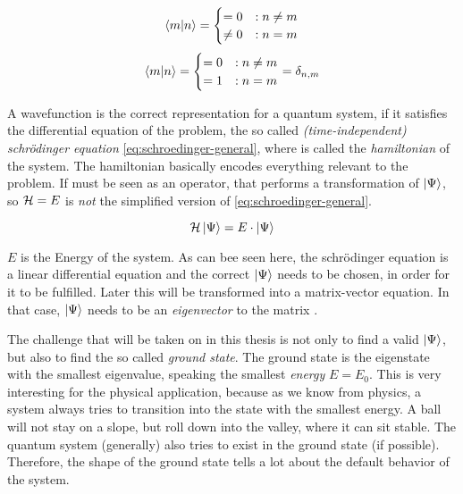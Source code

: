 \begin{equation}
    \label{eq:base-orthagonal}
    \bra{m}\ket{n} = \begin{cases}
         = 0 &: n\neq m\\
         \neq 0 &: n = m
    \end{cases}
\end{equation}
\begin{equation}
    \label{eq:base-orthonormal}
    \bra{m}\ket{n} = \begin{cases}
         = 0 &: n\neq m\\
         = 1 &: n = m
    \end{cases} = \delta_{n, m}
\end{equation}

A wavefunction is the correct representation for a quantum system, if it satisfies the differential equation of the problem, the so called \emph{(time-independent) schrödinger equation} \ref{eq:schroedinger-general}, where \hamiltonian is called the \emph{hamiltonian} of the system. The hamiltonian basically \glqq encodes\grqq{} everything relevant to the problem. If must be seen as an operator, that performs a transformation of $\ket{\Psi}$, so $\mathcal{H} = E$ is \emph{not} the simplified version of \ref{eq:schroedinger-general}.

\begin{equation}
    \label{eq:schroedinger-general}
    \mathcal{H} \ket{\Psi} = E \cdot \ket{\Psi}
\end{equation}

$E$ is the Energy of the system. As can bee seen here, the schrödinger equation is a linear differential equation and the correct $\ket{\Psi}$ needs to be chosen, in order for it to be fulfilled. Later this will be transformed into a matrix-vector equation. In that case, $\ket{\Psi}$ needs to be an \emph{eigenvector} to the matrix \hamiltonian.

The challenge that will be taken on in this thesis is not only to find a valid $\ket{\Psi}$, but also to find the so called \emph{ground state}. The ground state is the eigenstate with the smallest eigenvalue, speaking the smallest \emph{energy} $E = E_0$. 
This is very interesting for the physical application, because as we know from physics, a system always tries to transition into the state  with the smallest energy. A ball will not stay on a slope, but roll down into the valley, where it can sit stable. The quantum system (generally) also tries to exist in the ground state (if possible). Therefore, the shape of the ground state tells a lot about the \glqq default\grqq{} behavior of the system.